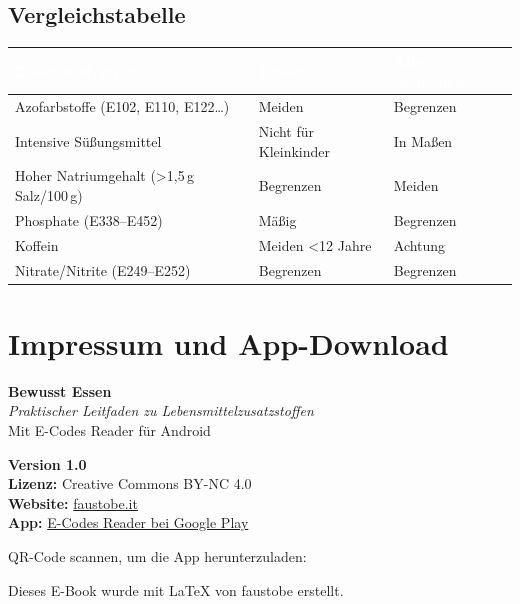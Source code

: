 \documentclass[a5paper,12pt,oneside,openany]{book}
\begin{document}
\section{Vergleichstabelle}

{\small
\begin{tabularx}{\textwidth}{|L|l|l|}
\hline
{}
  \textcolor{white}{\textbf{Zusatzstoff/Zutat}}
  & \textcolor{white}{\textbf{Kinder}}
  & \textcolor{white}{\textbf{\"{A}ltere Menschen}} \\
\hline
Azofarbstoffe (E102, E110, E122\ldots) & Meiden & Begrenzen \\
\hline
Intensive S\"{u}{\ss}ungsmittel & Nicht f\"{u}r Kleinkinder & In Ma{\ss}en \\
\hline
Hoher Natriumgehalt (>1,5\,g Salz/100\,g) & Begrenzen & Meiden \\
\hline
Phosphate (E338--E452) & M\"{a}{\ss}ig & Begrenzen \\
\hline
Koffein & Meiden <12 Jahre & Achtung \\
\hline
Nitrate/Nitrite (E249--E252) & Begrenzen & Begrenzen \\
\hline
\end{tabularx}
}

\backmatter

\chapter*{Impressum und App-Download}

\begin{center}
\vspace{1cm}
{\large\bfseries\color{verdescuro} Bewusst Essen}\\[0.4cm]
{\itshape Praktischer Leitfaden zu Lebensmittelzusatzstoffen}\\[0.3cm]
{\small Mit E-Codes Reader f\"{u}r Android}

\vspace{1.5cm}
\textbf{Version 1.0} \quad \textbullet {}\\
\textbf{Lizenz:} Creative Commons BY-NC 4.0\\[0.3cm]
\textbf{Website:} \href{https://faustobe.it}{faustobe.it}\\
\textbf{App:} \href{https://play.google.com/store/apps/details?id=it.faustobe.ecodes}{E-Codes Reader bei Google Play}

\vspace{1.5cm}
{\small QR-Code scannen, um die App herunterzuladen:}\\[0.5cm]


\vspace{1cm}
{\footnotesize Dieses E-Book wurde mit \LaTeX{} von faustobe erstellt.}
\end{center}
\end{document}
